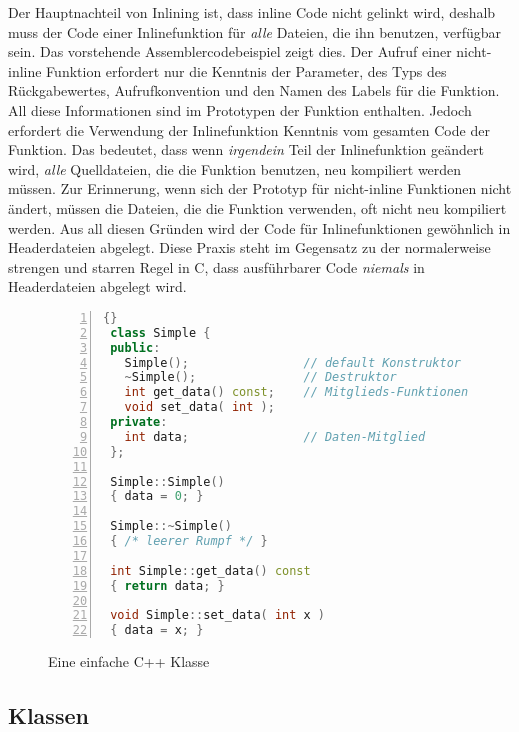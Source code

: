 Der Hauptnachteil von Inlining ist, dass inline Code nicht gelinkt
wird, deshalb muss der Code einer Inlinefunktion f\"{u}r \emph{alle}
Dateien, die ihn benutzen, verf\"{u}gbar sein. Das vorstehende
Assemblercodebeispiel zeigt dies. Der Aufruf einer nicht-inline
Funktion erfordert nur die Kenntnis der Parameter, des Typs des
R\"{u}ckgabewertes, Aufrufkonvention und den Namen des Labels f\"{u}r die
Funktion. All diese Informationen sind im Prototypen der Funktion
enthalten. Jedoch erfordert die Verwendung der Inlinefunktion
Kenntnis vom gesamten Code der Funktion. Das bedeutet, dass wenn
\emph{irgendein} Teil der Inlinefunktion ge\"{a}ndert wird, \emph{alle}
Quelldateien, die die Funktion benutzen, neu kompiliert werden
m\"{u}ssen. Zur Erinnerung, wenn sich der Prototyp f\"{u}r nicht-inline
Funktionen nicht \"{a}ndert, m\"{u}ssen die Dateien, die die Funktion
verwenden, oft nicht neu kompiliert werden. Aus all diesen Gr\"{u}nden
wird der Code f\"{u}r Inlinefunktionen gew\"{o}hnlich in Headerdateien
abgelegt. Diese Praxis steht im Gegensatz zu der normalerweise
strengen und starren Regel in C, dass ausf\"{u}hrbarer Code
\emph{niemals} in Headerdateien abgelegt wird. 

\begin{figure}[t]
\begin{lstlisting}[language=C++, frame=tlrb, numbers=left]{}
 class Simple {
 public:
   Simple();                // default Konstruktor
   ~Simple();               // Destruktor
   int get_data() const;    // Mitglieds-Funktionen
   void set_data( int );
 private:
   int data;                // Daten-Mitglied
 };

 Simple::Simple()
 { data = 0; }

 Simple::~Simple()
 { /* leerer Rumpf */ }

 int Simple::get_data() const
 { return data; }

 void Simple::set_data( int x )
 { data = x; }
\end{lstlisting}
\caption{Eine einfache C++ Klasse\label{fig:SimpleClass}}
\end{figure}

\subsection{Klassen}

